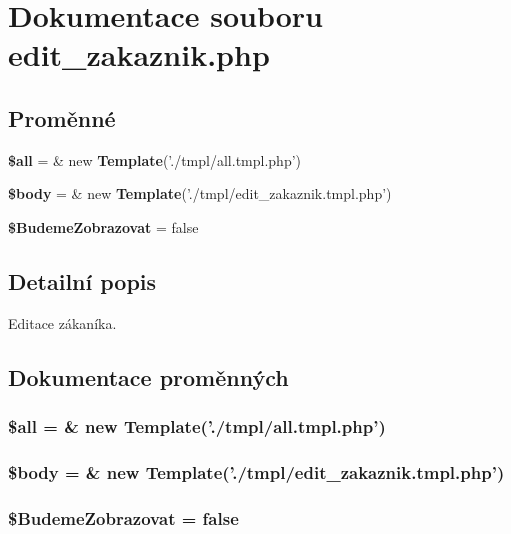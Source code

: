 \section{Dokumentace souboru edit\_\-zakaznik.php}
\label{edit__zakaznik_8php}
\subsection*{Proměnné}
\begin{CompactItemize}
\item 
{\bf \$all} = \& new {\bf Template}('./tmpl/all.tmpl.php')
\item 
{\bf \$body} = \& new {\bf Template}('./tmpl/edit\_\-zakaznik.tmpl.php')
\item 
{\bf \$BudemeZobrazovat} = false
\end{CompactItemize}


\subsection{Detailní popis}
Editace zákaníka. 

\subsection{Dokumentace proměnných}
\subsubsection{\setlength{\rightskip}{0pt plus 5cm}\$all = \& new {\bf Template}('./tmpl/all.tmpl.php')}\label{edit__zakaznik_8php_3c74ea9d2348c9aba28d36e692bef2d2}


\subsubsection{\setlength{\rightskip}{0pt plus 5cm}\$body = \& new {\bf Template}('./tmpl/edit\_\-zakaznik.tmpl.php')}\label{edit__zakaznik_8php_26b9f9373f7bb79dfcf8a86dff086b45}


\subsubsection{\setlength{\rightskip}{0pt plus 5cm}\$BudemeZobrazovat = false}\label{edit__zakaznik_8php_7257dc22059027fb436043d05c4adc71}


